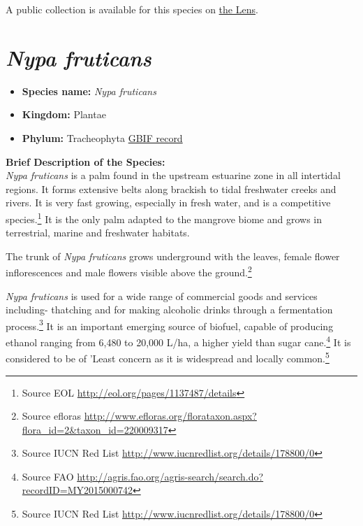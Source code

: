 \documentclass[]{book}
\providecommand{\tightlist}{%
  \setlength{\itemsep}{0pt}\setlength{\parskip}{0pt}}
\theoremstyle{definition}
\theoremstyle{definition}
\theoremstyle{definition}
\theoremstyle{remark}
\begin{document}
A public collection is available for this species on
\href{https://www.lens.org/lens/collection/24802}{the Lens}.

\hypertarget{nypa-fruticans}{%
\section{\texorpdfstring{\emph{Nypa
fruticans}}{Nypa fruticans}}\label{nypa-fruticans}}

\begin{itemize}
\tightlist
\item
  \textbf{Species name:} \emph{Nypa fruticans}
\item
  \textbf{Kingdom:} Plantae
\item
  \textbf{Phylum:} Tracheophyta
  \href{https://www.gbif.org/species/2738422}{GBIF record}
\end{itemize}

\textbf{Brief Description of the Species:}\\
\emph{Nypa fruticans} is a palm found in the upstream estuarine zone in
all intertidal regions. It forms extensive belts along brackish to tidal
freshwater creeks and rivers. It is very fast growing, especially in
fresh water, and is a competitive species.\footnote{Source EOL
  \url{http://eol.org/pages/1137487/details}} It is the only palm
adapted to the mangrove biome and grows in terrestrial, marine and
freshwater habitats.

The trunk of \emph{Nypa fruticans} grows underground with the leaves,
female flower inflorescences and male flowers visible above the
ground.\footnote{Source efloras
  \url{http://www.efloras.org/florataxon.aspx?flora_id=2\&taxon_id=220009317}}

\emph{Nypa fruticans} is used for a wide range of commercial goods and
services including- thatching and for making alcoholic drinks through a
fermentation process.\footnote{Source IUCN Red List
  \url{http://www.iucnredlist.org/details/178800/0}} It is an important
emerging source of biofuel, capable of producing ethanol ranging from
6,480 to 20,000 L/ha, a higher yield than sugar cane.\footnote{Source
  FAO
  \url{http://agris.fao.org/agris-search/search.do?recordID=MY2015000742}}
It is considered to be of 'Least concern as it is widespread and locally
common.\footnote{Source IUCN Red List
  \url{http://www.iucnredlist.org/details/178800/0}}
\end{document}
